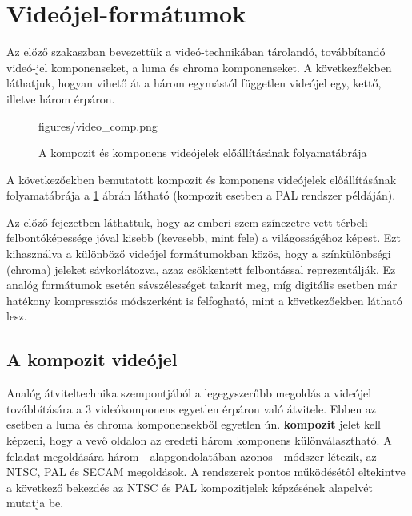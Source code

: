 
\section{Videójel-formátumok}

Az előző szakaszban bevezettük a videó-technikában tárolandó, továbbítandó videó-jel komponenseket, a luma és chroma komponenseket.
A következőekben láthatjuk, hogyan vihető át a három egymástól független videójel egy, kettő, illetve három érpáron.
\begin{figure}[]
	\centering
	\begin{overpic}[width = 0.90\columnwidth ]{figures/video_comp.png}
	\end{overpic}
	\caption{A kompozit és komponens videójelek előállításának folyamatábrája}
	\label{Fig:video_components}
\end{figure}
A következőekben bemutatott kompozit és komponens videójelek előállításának folyamatábrája a \ref{Fig:video_components} ábrán látható (kompozit esetben a PAL rendszer példáján).

Az előző fejezetben láthattuk, hogy az emberi szem színezetre vett térbeli felbontóképessége jóval kisebb (kevesebb, mint fele) a világosságéhoz képest.
Ezt kihasználva a különböző videójel formátumokban közös, hogy a színkülönbségi (chroma) jeleket sávkorlátozva, azaz csökkentett felbontással reprezentálják.
Ez analóg formátumok esetén sávszélességet takarít meg, míg digitális esetben már hatékony kompressziós módszerként is felfogható, mint a következőekben látható lesz.

\subsection{A kompozit videójel}
Analóg átviteltechnika szempontjából a legegyszerűbb megoldás a videójel továbbítására a 3 videókomponens egyetlen érpáron való átvitele.
Ebben az esetben a luma és chroma komponensekből egyetlen ún. \textbf{kompozit} jelet kell képzeni, hogy a vevő oldalon az eredeti három komponens különválasztható.
A feladat megoldására három---alapgondolatában azonos---módszer létezik, az NTSC, PAL és SECAM megoldások.
A rendszerek pontos működésétől eltekintve a következő bekezdés az NTSC és PAL kompozitjelek képzésének alapelvét mutatja be.


